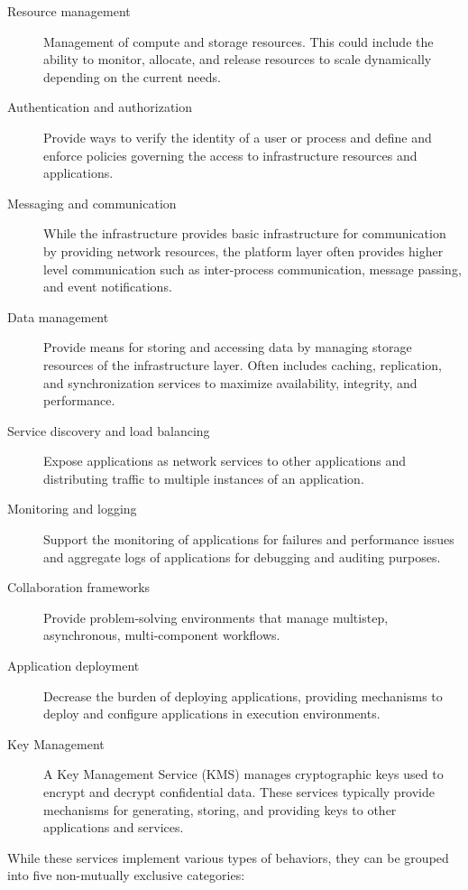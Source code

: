 \begin{description}
  \item[Resource management]
    Management of compute and storage resources. This could include the ability
    to monitor, allocate, and release resources to scale dynamically depending
    on the current needs.
  \item[Authentication and authorization]
    Provide ways to verify the identity of a user or process and define and
    enforce policies governing the access to infrastructure resources and
    applications.
  \item[Messaging and communication]
    While the infrastructure provides basic infrastructure for communication by
    providing network resources, the platform layer often provides higher level
    communication such as inter-process communication, message passing, and
    event notifications.
  \item[Data management]
    Provide means for storing and accessing data by managing storage resources
    of the infrastructure layer. Often includes caching, replication, and
    synchronization services to maximize availability, integrity, and
    performance.
  \item[Service discovery and load balancing]
    Expose applications as network services to other applications and
    distributing traffic to multiple instances of an application.
  \item[Monitoring and logging]
    Support the monitoring of applications for failures and performance issues
    and aggregate logs of applications for debugging and auditing purposes.
  \item[Collaboration frameworks]
    Provide problem-solving environments that manage multistep, asynchronous,
    multi-component workflows.
  \item[Application deployment]
    Decrease the burden of deploying applications, providing mechanisms to
    deploy and configure applications in execution environments.
  \item[Key Management]
    A Key Management Service (KMS) manages cryptographic keys used to encrypt
    and decrypt confidential data. These services typically provide mechanisms
    for generating, storing, and providing keys to other applications and
    services.
\end{description}

While these services implement various types of behaviors, they can be grouped
into five non-mutually exclusive categories:

